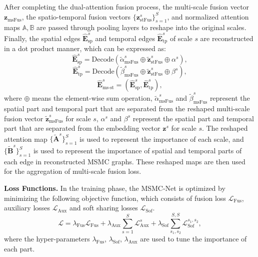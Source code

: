 \documentclass[journal]{IEEEtran}
\begin{document}
After completing the dual-attention fusion process, the multi-scale fusion vector $\mathbf{z}_{\mathrm{msFus}}^{}$, the spatio-temporal fusion vectors $\{ \mathbf{z}_{\mathrm{stFus}}^{s} \}^S_{s=1}$, and normalized attention maps $\mathbb{A}, \mathbb{B}$ are passed through pooling layers to reshape into the original scales. Finally, the spatial edges $\hat{\mathbf{E}}_{\textrm{sp}}^{s}$ and temporal edges $\hat{\mathbf{E}}_{\textrm{tp}}^{s}$ of scale $s$ are reconstructed in a dot product manner, which can be expressed as:
\begin{equation}
    \hat{\mathbf{E}}_{\textrm{sp}}^{s} = \textrm{Decode}({\widetilde{\alpha}_{\mathrm{msFus}}^{s}} \oplus {\widetilde{\mathbf{z}}_{\mathrm{stFus}}^{s}} \oplus {\alpha^{s}}),
\end{equation}
\begin{equation}
    \hat{\mathbf{E}}_{\textrm{tp}}^{s} = \textrm{Decode}({\widetilde{\beta}_{\mathrm{msFus}}^{s}} \oplus {\widetilde{\mathbf{z}}_{\mathrm{stFus}}^{s}} \oplus {\beta^{s}}),
\end{equation}
\begin{equation}
    \hat{\mathbf{E}}_{\textrm{ms-st}}^{s} = (\hat{\mathbf{E}}_{\textrm{sp}}^{s} , \hat{\mathbf{E}}_{\textrm{tp}}^{s}),
\end{equation}
where $\oplus$ means the element-wise sum operation, ${\widetilde{\alpha}_{\mathrm{msFus}}^{s}}$ and ${\widetilde{\beta}_{\mathrm{msFus}}^{s}}$ represent the spatial part and temporal part that are separated from the reshaped multi-scale fusion vector $ \widetilde{\mathbf{z}}_{\mathrm{msFus}}^s $ for scale $s$, ${\alpha^{s}}$ and ${\beta^{s}}$ represent the spatial part and temporal part that are separated from the embedding vector $\mathbf{z}^s$ for scale $s$.
The reshaped attention map $ \{\widetilde{\mathbf{A}}^{s}\}_{s=1}^{S} $ is used to represent the importance of each scale, and $\{\widetilde{\mathbf{B}}^{s}\}_{s=1}^{S} $ is used to represent the importance of spatial and temporal parts of each edge in reconstructed MSMC graphs. These reshaped maps are then used for the aggregation of multi-scale fusion loss.


\vskip 0.03in
\noindent\textbf{Loss Functions.}
In the training phase, the MSMC-Net is optimized by minimizing the following objective function, which consists of fusion loss $\mathcal{L}_{\mathrm{Fus}}$, auxiliary losses $\mathcal{L}_{\mathrm{Aux}}$ and soft sharing losses $\mathcal{L}_{\mathrm{Sof}}$.
\begin{equation}
\mathcal{L} = \lambda_{\mathrm{Fus}}\mathcal{L}_{\mathrm{Fus}}  + \lambda_{\mathrm{Aux}}\sum_{s=1}^{S} \mathcal{L}^{s}_{\mathrm{Aux}} + \lambda_{\mathrm{Sof}}\sum_{s_{1},s_2}^{S,S}
\mathcal{L}_{\mathrm{Sof}}^{s_1,s_2},
\end{equation}
where the hyper-parameters $ \lambda_{\mathrm{Fus}} $, $ \lambda_{\mathrm{Sof}} $, $ \lambda_{\mathrm{Aux}} $ are used to tune the importance of each part.
\end{document}
